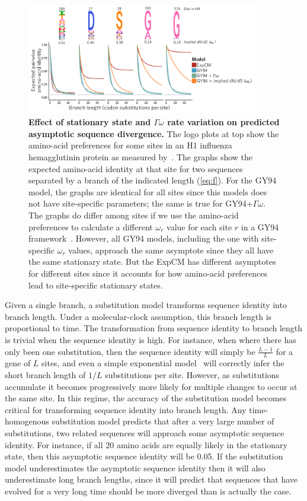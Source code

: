 \documentclass[11pt]{article}
\begin{document}
\begin{figure}
\centerline{\includegraphics[width=0.90\textwidth]{figures/decay.pdf}}
\caption{\label{fig:decay}
\textbf{Effect of stationary state and $\Gamma\omega$ rate variation on predicted asymptotic sequence divergence.}
The logo plots at top show the amino-acid preferences for some sites in an H1 influenza hemagglutinin protein as measured by~\citet{doud2016accurate}.
The graphs show the expected amino-acid identity at that site for two sequences separated by a branch of the indicated length (\ref{eq:f}).
For the GY94 model, the graphs are identical for all sites since this models does not have site-specific parameters; the same is true for GY94+$\Gamma\omega$.
The graphs do differ among sites if we use the amino-acid preferences to calculate a different $\omega_r$ value for each site $r$ in a GY94 framework~\citep[\ref{eq:w_r};][]{spielman2015relationship}.
However, all GY94 models, including the one with site-specific $\omega_r$ values, approach the same asymptote since they all have the same stationary state.
But the ExpCM has different asymptotes for different sites since it accounts for how amino-acid preferences lead to site-specific stationary states.
}
\end{figure}

Given a single branch, a substitution model transforms sequence identity into branch length.
Under a molecular-clock assumption, this branch length is proportional to time.
The transformation from sequence identity to branch length is trivial when the sequence identity is high.
For instance, when where there has only been one substitution, then the sequence identity will simply be $\frac{L - 1}{L}$ for a gene of $L$ sites, and even a simple exponential model~\citep{zuckerkandl1965} will correctly infer the short branch length of $1/L$ substitutions per site.
However, as substitutions accumulate it becomes progressively more likely for multiple changes to occur at the same site.
In this regime, the accuracy of the substitution model becomes critical for transforming sequence identity into branch length.
Any time-homogenous substitution model predicts that after a very large number of substitutions, two related sequences will approach some asymptotic sequence identity.
For instance, if all 20 amino acids are equally likely in the stationary state, then this asymptotic sequence identity will be 0.05.
If the substitution model underestimates the asymptotic sequence identity then it will also underestimate long branch lengths, since it will predict that sequences that have evolved for a very long time should be more diverged than is actually the case.
\end{document}
